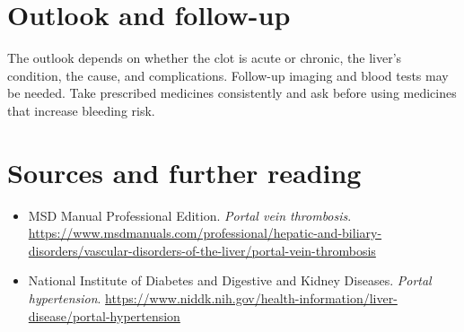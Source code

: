 \section*{Outlook and follow-up}
The outlook depends on whether the clot is acute or chronic, the liver's condition, the cause, and complications. Follow-up imaging and blood tests may be needed. Take prescribed medicines consistently and ask before using medicines that increase bleeding risk.

\section*{Sources and further reading}
\begin{itemize}
\item MSD Manual Professional Edition. \textit{Portal vein thrombosis}. \url{https://www.msdmanuals.com/professional/hepatic-and-biliary-disorders/vascular-disorders-of-the-liver/portal-vein-thrombosis}
\item National Institute of Diabetes and Digestive and Kidney Diseases. \textit{Portal hypertension}. \url{https://www.niddk.nih.gov/health-information/liver-disease/portal-hypertension}
\end{itemize}
